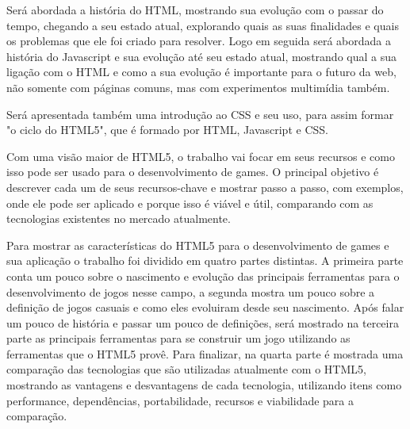 Será abordada a história do HTML, mostrando sua evolução com o passar do tempo, chegando
a seu estado atual, explorando quais as suas finalidades e quais os problemas que ele foi criado para resolver.
Logo em seguida será abordada a história do Javascript e sua evolução até seu estado
atual, mostrando qual a sua ligação com o HTML e como a sua evolução é importante
para o futuro da web, não somente com páginas comuns, mas com experimentos multimídia também.

Será apresentada também uma introdução ao CSS e seu uso, para assim formar "o ciclo
do HTML5", que é formado por HTML, Javascript e CSS.

Com uma visão maior de HTML5, o trabalho vai focar em seus recursos e como isso pode
ser usado para o desenvolvimento de games. O principal objetivo é
descrever cada um de seus recursos-chave e mostrar passo a passo, com exemplos, onde ele pode ser aplicado e porque isso
é viável e útil, comparando com as tecnologias existentes no mercado atualmente.

Para mostrar as características do HTML5 para o desenvolvimento de
games e sua aplicação o trabalho foi dividido em quatro partes
distintas. A primeira parte conta um pouco sobre o nascimento e
evolução das principais ferramentas para o desenvolvimento de jogos
nesse campo, a segunda mostra um pouco sobre a definição de jogos casuais e como
eles evoluiram desde seu nascimento. Após falar um pouco de história e
passar um pouco de definições, será mostrado na terceira parte as
principais ferramentas para se construir um jogo utilizando as
ferramentas que o HTML5 provê. Para finalizar, na quarta parte é
mostrada uma comparação das tecnologias que são utilizadas atualmente
com o HTML5, mostrando as vantagens e desvantagens de cada tecnologia,
utilizando itens como performance, dependências, portabilidade,
recursos e viabilidade para a comparação.
